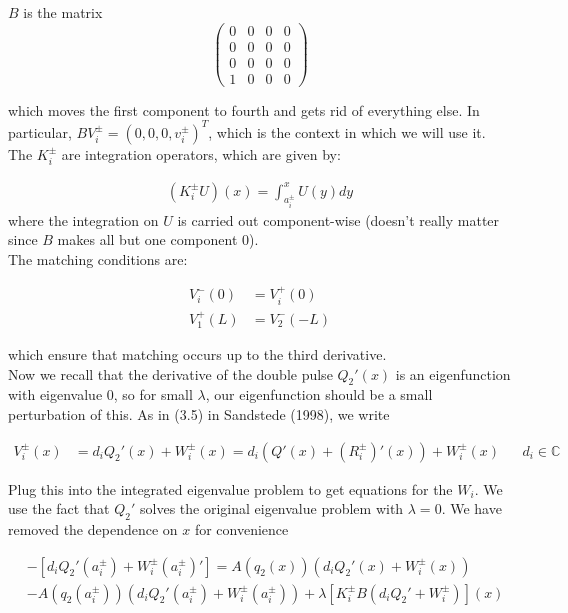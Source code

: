 \documentclass[12pt]{article}
\def\C{{\mathbb C}}
\begin{document}
$B$ is the matrix
\[
\begin{pmatrix}0 & 0 & 0 & 0 \\0 & 0 & 0 & 0 \\0 & 0 & 0 & 0 \\1 & 0 & 0 & 0 \end{pmatrix}
\]

which moves the first component to fourth and gets rid of everything else. In particular, $B V_i^\pm = (0, 0,0, v_i^\pm)^T$, which is the context in which we will use it.\\

The $K_i^\pm$ are integration operators, which are given by:

\begin{align*}
(K_i^\pm U)(x) = \int_{a_i^\pm}^x U(y) dy
\end{align*}
where the integration on $U$ is carried out component-wise (doesn't really matter since $B$ makes all but one component 0).\\

The matching conditions are:

\begin{align*}
V_i^-(0) &= V_i^+(0) \\
V_1^+(L) &= V_2^-(-L)
\end{align*}

which ensure that matching occurs up to the third derivative.\\

Now we recall that the derivative of the double pulse $Q_2'(x)$ is an eigenfunction with eigenvalue 0, so for small $\lambda$, our eigenfunction should be a small perturbation of this. As in (3.5) in Sandstede (1998), we write

\begin{align}
V_i^\pm(x) &= d_i Q_2'(x) + W_i^\pm(x) = d_i (Q'(x) + (R_i^\pm)'(x)) + W_i^\pm(x) && d_i \in \C
\end{align}

Plug this into the integrated eigenvalue problem to get equations for the $W_i$. We use the fact that $Q_2'$ solves the original eigenvalue problem with $\lambda = 0$. We have removed the dependence on $x$ for convenience

\begin{align*}
[d_i Q_2'(x) + W_i^\pm(x)'] &- [d_i Q_2'(a_i^\pm) + W_i^\pm(a_i^\pm)'] = A(q_2(x)) (d_i Q_2'(x) + W_i^\pm(x)) \\
&- A(q_2(a_i^\pm)) (d_i Q_2'(a_i^\pm) + W_i^\pm(a_i^\pm)) + \lambda [K_i^\pm B (d_i Q_2' + W_i^\pm)](x)\\
\end{align*}
\end{document}
